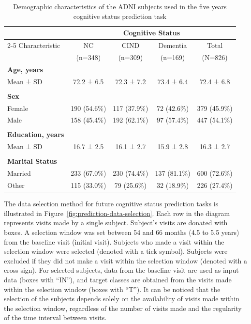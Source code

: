 \begin{table}[htbp]
\centering
\caption{Demographic characteristics of the ADNI subjects used in the five years cognitive status prediction task}
\label{table:adni-prediction-demographics}
\footnotesize
\begin{tabular}{lcccc}
\toprule
 & \multicolumn{4}{c}{Cognitive Status} \\
\cmidrule{2-5}
Characteristic & NC & CIND & Dementia & Total \\
 & (n=348) & (n=309) & (n=169) & (N=826) \\
\midrule
\textbf{Age, years} \\
\quad Mean ± \acrshort{SD} & 72.2 ± 6.5 & 72.3 ± 7.2 & 73.4 ± 6.4 & 72.4 ± 6.8 \\
\\
\textbf{Sex} \\
\quad Female & 190 (54.6\%) & 117 (37.9\%) & 72 (42.6\%) & 379 (45.9\%) \\
\quad Male & 158 (45.4\%) & 192 (62.1\%) & 97 (57.4\%) & 447 (54.1\%) \\
\\
\textbf{Education, years} \\
\quad Mean ± SD & 16.7 ± 2.5 & 16.1 ± 2.7 & 15.9 ± 2.8 & 16.3 ± 2.7 \\
\\
\textbf{Marital Status} \\
\quad Married & 233 (67.0\%) & 230 (74.4\%) & 137 (81.1\%) & 600 (72.6\%) \\
\quad Other & 115 (33.0\%) & 79 (25.6\%) & 32 (18.9\%) & 226 (27.4\%) \\
\bottomrule
\end{tabular}
\end{table}

The data selection method for future cognitive status prediction tasks is illustrated in Figure~\ref{fig:prediction-data-selection}. Each row in the diagram represents visits made by a single subject. Subject's visits are donated with boxes. A selection window was set between 54 and 66 months (4.5 to 5.5 years) from the baseline visit (initial visit). Subjects who made a visit within the selection window were selected (denoted with a tick symbol). Subjects were excluded if they did not make a visit within the selection window (denoted with a cross sign). For selected subjects, data from the baseline visit are used as input data (boxes with ``IN''), and target classes are obtained from the visits made within the selection window (boxes with ``T''). It can be noticed that the selection of the subjects depends solely on the availability of visits made within the selection window, regardless of the number of visits made and the regularity of the time interval between visits. 

